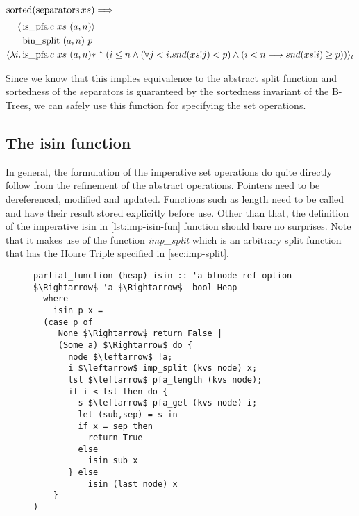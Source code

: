 \begin{lemma} $\operatorname{sorted} (\operatorname{separators} xs) \Longrightarrow$ \\
    \begin{align*}
        \langle &\operatorname{is\_pfa} c\ xs\ (a,n)\rangle \\
                  &\operatorname{bin\_split}\ (a,n)\ p \\
        \langle \lambda i. & \operatorname{is\_pfa} c\ xs\ (a,n)
        * \uparrow(i \leq n 
            \wedge (\forall j < i. snd (xs!j) < p) 
            \wedge (i<n \longrightarrow snd (xs!i) \geq p)) \rangle_t 
    \end{align*}
\end{lemma}

Since we know that this implies equivalence to the abstract split function
and sortedness of the separators is guaranteed by the sortedness
invariant of the B-Trees,
we can safely use this function for specifying
the set operations.


\subsection{The isin function}

In general, the formulation of the imperative set operations
do quite directly follow
from the refinement of the abstract operations.
Pointers need to be dereferenced, modified and updated.
Functions such as length need to be called and have their result
stored explicitly before use.
Other than that, the definition of the imperative isin in \autoref{lst:imp-isin-fun}
function should bare no surprises.
Note that it makes use of the function \textit{imp\_split}
which is an arbitrary split function that has the Hoare Triple
specified in \autoref{sec:imp-split}.

\begin{figure}
\begin{lstlisting}[mathescape=true, language=Isabelle, label={lst:imp-isin-fun},
    caption={The imperative isin function}]
partial_function (heap) isin :: 'a btnode ref option $\Rightarrow$ 'a $\Rightarrow$  bool Heap
  where
    isin p x =
  (case p of
     None $\Rightarrow$ return False |
     (Some a) $\Rightarrow$ do {
       node $\leftarrow$ !a;
       i $\leftarrow$ imp_split (kvs node) x;
       tsl $\leftarrow$ pfa_length (kvs node);
       if i < tsl then do {
         s $\leftarrow$ pfa_get (kvs node) i;
         let (sub,sep) = s in
         if x = sep then
           return True
         else
           isin sub x
       } else
           isin (last node) x
    }
)
\end{lstlisting}
\end{figure}

